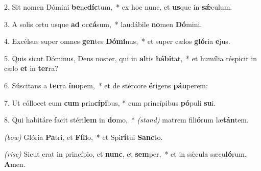 2. Sit nomen Dómini \textbf{be}ne\textbf{díc}\-tum,~*
	ex hoc nunc, et \textbf{us}que in \textbf{s\'{\ae}}culum.

3. A solis ortu usque \textbf{ad} oc\textbf{cá}sum,~*
	laudábile \textbf{no}men \textbf{Dó}mini.

4. Excélsus super omnes \textbf{gen}tes \textbf{Dó}\textbf{mi}nus,~*
	et super cælos \textbf{gló}ria \textbf{e}jus.

5. Quis sicut Dóminus, Deus noster, qui in \textbf{al}tis \textbf{há}\textbf{bi}tat,~*
	et humília réspicit in cælo \textbf{et} in \textbf{ter}ra?

6. Súscitans a \textbf{ter}ra \textbf{ín}\textbf{o}pem,~*
	et de stércore \textbf{é}rigens \textbf{páu}perem:

7. Ut cóllocet eum \textbf{cum} prin\textbf{cí}\textbf{pi}bus, *
	cum princípibus \textbf{pó}puli \textbf{su}i.

8. Qui habitáre facit stéri\textbf{lem} in \textbf{do}mo,~* {\color{red}\textit{(stand)}}
	matrem fili\textbf{ó}rum læ\textbf{tán}tem.

{\color{red}\textit{(bow)}} Glória \textbf{Pa}tri, et \textbf{Fí}\textbf{li}o,~*
	et Spi\textbf{rí}tui \textbf{Sanc}to.
	
{\color{red}\textit{(rise)}} Sicut erat in princípio, et \textbf{nunc}, et \textbf{sem}per,~*
	et in s\'{\ae}cula sæcu\textbf{ló}rum. \textbf{A}men.
